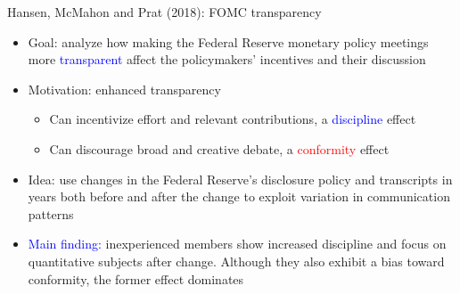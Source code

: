 \documentclass[english]{beamer}
\begin{document}
\begin{frame}{Hansen, McMahon and Prat (2018): FOMC transparency}
\begin{itemize}
\setlength{\itemsep}{1.5em}
\item Goal: analyze how making the Federal Reserve monetary policy meetings more \textcolor{blue}{transparent} affect the policymakers' incentives and their discussion
\item Motivation: enhanced transparency
\begin{itemize}
    \item Can incentivize effort and relevant contributions, a \textcolor{blue}{discipline} effect
    \item Can discourage broad and creative debate, a \textcolor{red}{conformity} effect
\end{itemize}
\item Idea: use changes in the Federal Reserve's disclosure policy and transcripts in years both before and after the change to exploit variation in communication patterns

\item \textcolor{blue}{Main finding:} inexperienced members show increased discipline and focus on quantitative subjects after change. Although they also exhibit a bias toward conformity, the former effect dominates
\end{itemize}
\end{frame}%
\end{document}
